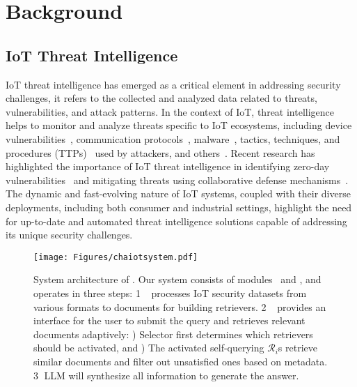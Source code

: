 \section{Background}\label{sec:back}

\subsection{IoT Threat Intelligence}\label{sec:iotintell}
IoT threat intelligence has emerged as a critical element in addressing security challenges, it refers to the collected and analyzed data related to threats, vulnerabilities, and attack patterns. 
In the context of IoT, threat intelligence helps to monitor and analyze threats specific to IoT ecosystems, including device vulnerabilities~\cite{VARIoT_db}, communication protocols~\cite{dragomir2016survey}, malware~\cite{alrawi2021circle}, tactics, techniques, and procedures (TTPs)~\cite{strom2018mitre} used by attackers, and others~\cite{iacovazzi2023towards,bou2020cyber,wagner2019cyber}.
Recent research has highlighted the importance of IoT threat intelligence in identifying zero-day vulnerabilities~\cite{saurabh2024hms} and mitigating threats using collaborative defense mechanisms~\cite{ahmed2023securing}.
The dynamic and fast-evolving nature of IoT systems, coupled with their diverse deployments, including both consumer and industrial settings, highlight the need for up-to-date and automated threat intelligence solutions capable of addressing its unique security challenges.



\begin{figure*}[ht]
    \centering
    \texttt{[image: Figures/chaiotsystem.pdf]}
    \caption{System architecture of \chatiot. Our system consists of modules \datakit\ and \iotrgen, and operates in three steps: \textcircled{1} \datakit\ processes IoT security datasets from various formats to documents for building retrievers. \textcircled{2} \iotrgen\ provides an interface for the user to submit the query and retrieves relevant documents adaptively: ) Selector first determines which retrievers should be activated, and ) The activated self-querying $\mathcal{R}_i$s retrieve similar documents and filter out unsatisfied ones based on metadata.
    \textcircled{3} LLM will synthesize all information to generate the answer.}
    \label{fig:system}
\end{figure*}


